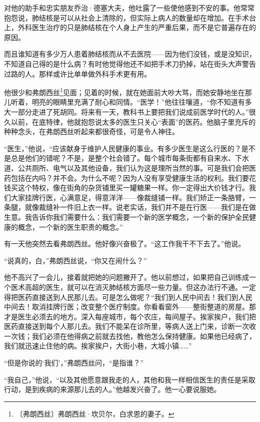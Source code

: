 \documentclass[12pt,UTF-8,openany]{ctexbook}
\begin{document}
\begin{large}
    对他的助手和忠实朋友乔治·德塞大夫，他吐露了一些使他感到不安的事。他常常抱怨说，肺结核是可以从社会上清除的，但实际上病人的数量却在增加。在手术台上，外科医生治疗的只是肺结核在个人身上产生的严重后果，而不是它普遍存在的原因。
    
    而且谁知道有多少万人患着肺结核而从不去医院——因为他们没钱，或是没知识，不知道自己得的是什么病？有时他觉得他还不如把手术刀扔掉，站在街头大声警告过路的人。那样或许比单单做外科手术更有用。
    
    他很少和弗朗西丝\footnote{〔弗朗西丝〕弗朗西丝·坎贝尔，白求恩的妻子。}见面；见着的时候，就在她面前大吵大骂，而她安静地坐在那儿听着，明亮的眼睛里充满了耐心和同情。“医学！”他往往嚷道，“你不知道有多大一部分走进了死胡同。将来有一天，教科书上要把我们说成前医学时代的人。”很久以前，在底特律，他就抱怨说太多的医生只关心“表面”的医药。他脑子里充斥的种种念头，在弗朗西丝听起来都很奇怪，可是令人神往。
    
    “医生，”他说，“应该献身于维护人民健康的事业。有多少医生是这么行医的？是不是总是他们的错呢？不是，是整个社会错了。每个城市每条街都有自来水、下水道、公共厕所、电气以及其他设备，我们认为这是理所当然的事。可是我们会把医药包括在内吗？并不会。为什么不呢？因为人没有享受健康生活的权利。我们要花钱买这个特权，像在街角的杂货铺里买一罐糖果一样。你一定得出大价钱才行。我们大家挂牌行医，心满意足，得意洋洋——像裁缝铺一样。我们矫正一条胳臂，一条腿，就像裁缝补一件旧上衣一样。说老实话，我们并不是在行医——我们是在做生意。我告诉你我们需要什么：我们需要一个新的医学概念，一个新的保护全民健康的概念，一个新的医生职责的概念。”
    
    有一天他突然去看弗朗西丝。他好像兴奋极了。“这工作我干不下去了。”他说。
    
    “说真的，白，”弗朗西丝说，“你又在闹什么？”
    
    他不高兴了一会儿，接着就把她的问题撇开了。他以前想过，如果把自己训练成一个医术高超的医生，就可以在消灭肺结核方面尽一些力量。但这办法行不通。一定得把医药直接送到人民那儿去。可是怎么做呢？“我们到人民中间去！我们到人民中间去！取消挂牌行医；改变整个医疗制度。你看看窗外——整街整道的房屋。那才是医生必须去的地方。深入每座城市，每个农庄，每间屋子。挨家挨户，我们把医药直接送到每个人那儿去。我们不能呆在诊所里，等病人送上门来，诊断一次收一次钱；我们必须在他得病之前就去找他，教他怎么保持健康。如果他已经病了，我们就迅速止住他的病。挨家挨户，大街小巷，大城小镇……”
    
    “但是你说的‘我们’，”弗朗西丝问，“是指谁？”
    
    “我自己，”他说，“以及其他愿意跟我走的人，其他和我一样相信医生的责任是采取行动，是到疾病的来源那儿去的人。”他越发兴奋了。他一心要说服她。
    

\end{large}
\end{document}
